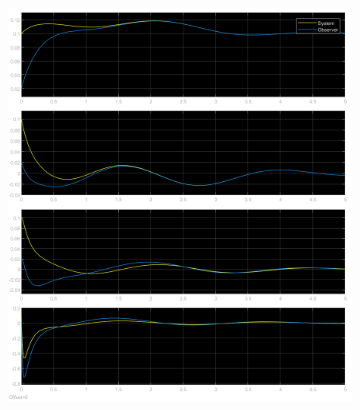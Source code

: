 \documentclass[class=article, crop=false]{standalone}
\begin{document}
\begin{resolution}
    \begin{figure}[H]
        \centering
        \begin{subfigure}[b]{0.475\textwidth}
            \centering
            \includegraphics[width=\textwidth]{../images/simulink_scope5_01_1_02.png}
            \caption{}
        \end{subfigure}
        \begin{subfigure}[b]{0.475\textwidth}
            \centering

\end{subfigure}
\end{figure}
\end{resolution}
\end{document}

